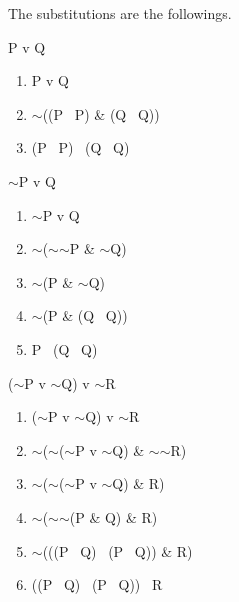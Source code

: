 \documentclass[a4paper,12pt]{article}
\newcommand{\ms}{$\sim$}
\newcommand{\tb}{\textbar \ }
\begin{document}
\begin{enumerate}[label=\arabic*,leftmargin=*]
        \item The substitutions are the followings.
            \begin{enumerate}[label=(\roman*)]
                \begin{minipage}{\textwidth}
                \item P v Q
                    \begin{enumerate}[label=\arabic*.]
                        \item P v Q
                        \item \ms ((P \tb P) \& (Q \tb Q))
                        \item (P \tb P) \tb (Q \tb Q)
                    \end{enumerate}
                    \vspace{1em}
                \end{minipage}
                \begin{minipage}{\textwidth}
                \item \ms P v Q
                    \begin{enumerate}[label=\arabic*.]
                        \item \ms P v Q
                        \item \ms (\ms \ms P \& \ms Q)
                        \item \ms (P \& \ms Q)
                        \item \ms (P \& (Q \tb Q))
                        \item P \tb (Q \tb Q)
                    \end{enumerate}
                    \vspace{1em}
                \end{minipage}
                \begin{minipage}{\textwidth}
                \item (\ms P v \ms Q) v \ms R
                    \begin{enumerate}[label=\arabic*.]
                        \item (\ms P v \ms Q) v \ms R
                        \item \ms (\ms (\ms P v \ms Q) \& \ms \ms R)
                        \item \ms (\ms (\ms P v \ms Q) \& R)
                        \item \ms (\ms \ms (P \& Q) \& R)
                        \item \ms (((P \tb Q) \tb (P \tb Q)) \& R)
                        \item ((P \tb Q) \tb (P \tb Q)) \tb R
                    \end{enumerate}
                    \vspace{1em}
                \end{minipage}


\end{enumerate}
\end{enumerate}
\end{document}
